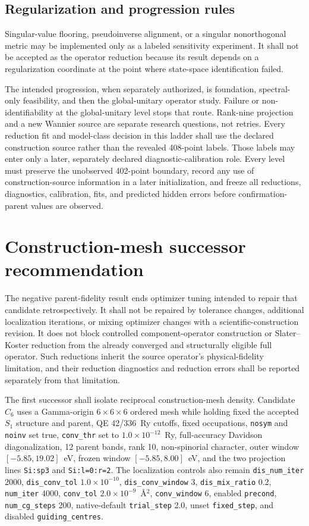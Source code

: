 \documentclass[11pt]{article}
\begin{document}
\subsection{Regularization and progression rules}

Singular-value flooring, pseudoinverse alignment, or a singular nonorthogonal metric may
be implemented only as a labeled sensitivity experiment.  It shall not be accepted as
the operator reduction because its result depends on a regularization coordinate at the
point where state-space identification failed.

The intended progression, when separately authorized, is foundation, spectral-only
feasibility, and then the global-unitary operator study.  Failure or non-identifiability
at the global-unitary level stops that route.  Rank-nine projection and a new Wannier
source are separate research questions, not retries.  Every reduction fit and
model-class decision in this ladder shall use the declared construction source rather
than the revealed 408-point labels.  Those labels may enter only a later, separately
declared diagnostic-calibration role.  Every level must preserve the unobserved
402-point boundary, record any use of construction-source information in a later
initialization, and freeze all reductions, diagnostics, calibration, fits, and predicted
hidden errors before confirmation-parent values are observed.

\section{Construction-mesh successor recommendation}

The negative parent-fidelity result ends optimizer tuning intended to repair that
candidate retrospectively.  It shall not be repaired by tolerance changes, additional
localization iterations, or mixing optimizer changes with a scientific-construction
revision.  It does not block controlled component-operator construction or
Slater--Koster reduction from the already converged and structurally eligible full
operator.  Such reductions inherit the source operator's physical-fidelity limitation,
and their reduction diagnostics and reduction errors shall be reported separately from
that limitation.

The first successor shall isolate reciprocal construction-mesh density.  Candidate
$C_6$ uses a Gamma-origin $6\times6\times6$ ordered mesh while holding fixed the accepted
$S_1$ structure and parent, QE 42/336~Ry cutoffs, fixed occupations,
\texttt{nosym} and \texttt{noinv} set true, \texttt{conv\_thr} set to
$1.0\times10^{-12}$~Ry, full-accuracy Davidson diagonalization, 12 parent bands,
rank 10, non-spinorial character, outer window
$[-5.85,19.02]$~eV, frozen window $[-5.85,8.00]$~eV, and the two projection lines
\texttt{Si:sp3} and \texttt{Si:l=0:r=2}.  The localization controls also remain
\texttt{dis\_num\_iter} 2000, \texttt{dis\_conv\_tol} $1.0\times10^{-10}$,
\texttt{dis\_conv\_window} 3, \texttt{dis\_mix\_ratio} 0.2,
\texttt{num\_iter} 4000, \texttt{conv\_tol} $2.0\times10^{-9}$~\AA$^2$,
\texttt{conv\_window} 6, enabled \texttt{precond}, \texttt{num\_cg\_steps} 200,
native-default \texttt{trial\_step} 2.0, unset \texttt{fixed\_step}, and disabled
\texttt{guiding\_centres}.
\end{document}
